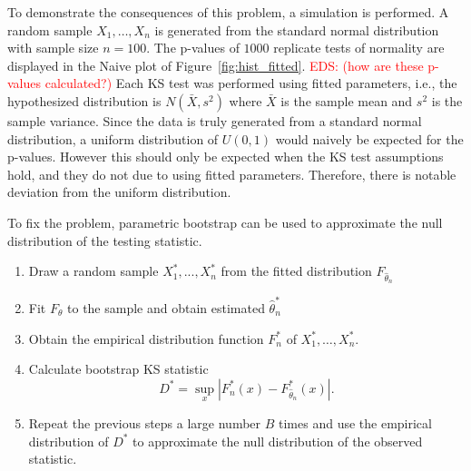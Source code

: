 \documentclass[12pt, letterpaper, titlepage]{article}
\newcommand{\eds}[1]{\textcolor{red}{EDS: (#1)}}
\begin{document}
To demonstrate the consequences of this problem, a simulation is performed. A
random sample $X_1, \ldots, X_n$ is generated from the standard normal
distribution with sample size $n = 100$. The p-values of $1000$ replicate tests
 of normality
are displayed in the Naive plot of Figure~\ref{fig:hist_fitted}.
\eds{how are these p-values calculated?}
Each KS test
was performed using fitted parameters, i.e., the hypothesized distribution is
$N(\bar X, s^2)$ where $\bar X$ is the sample mean and $s^2$ is the sample
variance. Since the data is truly generated from a standard normal distribution,
a uniform distribution of $U(0, 1)$ would naively be expected for the p-values.
However this should only be expected when the KS test assumptions hold, and they
 do not due to using fitted parameters. Therefore,
there is notable deviation from the uniform distribution.


To fix the problem, parametric bootstrap can be used to approximate the null
distribution of the testing statistic.
\begin{enumerate}
  \item
    Draw a random sample $X_1^*,...,X_n^*$ from the fitted distribution
    $F_{\hat\theta_n}$
  \item
    Fit $F_\theta$ to the sample and obtain estimated $\hat\theta_n^*$
  \item
    Obtain the empirical distribution function $F_n^*$ of $X_1^*, \ldots,
    X_n^*$.
  \item
    Calculate bootstrap KS statistic
    \[
      D^* = \sup_x | F_n^* (x)- F_{\hat\theta_n}^*(x) |.
    \]
  \item
    Repeat the previous steps a large number $B$ times and use the empirical
    distribution of $D^*$ to approximate the null distribution of the observed
    statistic.
\end{enumerate}
\end{document}
